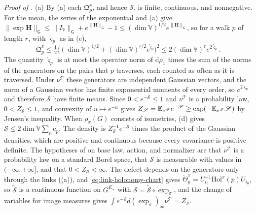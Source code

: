 \noindent\emph{Proof of .}
(a) By (a) each $\mathfrak Q^x_p$, and hence $\mathscr S$, is finite,
continuous, and nonnegative. For the mean, the series of the exponential and
(a) give
$\lVert\exp\mathbf H\rVert_{\mathsf G}\leq\lVert I_{\mathbb V}\rVert_{\mathsf G}+e^{\lVert\mathbf H\rVert_{\mathsf G}}-1\leq(\dim\mathbb V)^{1/2}e^{\lVert\mathbf H\rVert_{\mathsf G}}$,
so for a walk $p$ of length $r$, with $\mathring\varsigma_p$ as in (e),
\begin{equation*}
\mathfrak Q^x_p\leq\tfrac12\bigl((\dim\mathbb V)^{1/2}+(\dim\mathbb V)^{r/2}e^{\mathring\varsigma_p}\bigr)^2
\leq2(\dim\mathbb V)^re^{2\mathring\varsigma_p}.
\end{equation*}
The quantity $\mathring\varsigma_p$ is at most the operator norm of $\mathrm d\rho_x$ times the sum of
the norms of the generators on the pairs that $p$ traverses, each counted as often as it is traversed.
Under $\nu^{\mathscr T}$ these generators are independent Gaussian vectors, and the norm of a Gaussian
vector has finite exponential moments of every order, so $e^{2\mathring\varsigma_p}$ and therefore
$\mathscr S$ have finite means. Since $0<e^{-\mathscr S}\leq1$ and $\nu^{\mathscr T}$ is a probability law,
$0<Z_{\mathscr S}\leq1$, and convexity of $u\mapsto e^{-u}$ gives
$Z_{\mathscr S}=\mathbb E_{\nu^{\mathscr T}}e^{-\mathscr S}\geq\exp(-\mathbb E_{\nu^{\mathscr T}}\mathscr S)$ by Jensen's
inequality. When $\rho_x(G)$ consists of isometries, (d) gives
$\mathscr S\leq2\dim\mathbb V\sum_p\mathrm c_p$. The density is $Z_{\mathscr S}^{-1}e^{-\mathscr S}$
times the product of the Gaussian densities, which are positive and continuous because every
covariance is positive definite. The hypotheses of  on base law, action,
and normalizer are that $\nu^{\mathscr T}$ is a probability law on a standard Borel space, that
$\mathscr S$ is measurable with values in $(-\infty,+\infty]$, and that $0<Z_{\mathscr S}<\infty$. The
defect depends on the generators only through the links ((a)), and
\cref{eq:link-holonomy-chart} gives $\mathring\Theta^x_p=U_{i_0}^{-1}\mathrm{Hol}^x(p)U_{i_0}$, so
$\widetilde{\mathscr S}$ is a continuous function on $G^{E_+}$ with
$\mathscr S=\widetilde{\mathscr S}\circ\exp_\sigma$, and the change of variables for image measures gives
$\int e^{-\widetilde{\mathscr S}}d(\exp_\sigma)_\#\nu^{\mathscr T}=Z_{\mathscr S}$.

